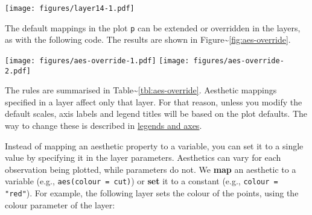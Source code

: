 \texttt{[image: figures/layer14-1.pdf]}

The default mappings in the plot \texttt{p} can be extended or
overridden in the layers, as with the following code.
 The results are shown in
Figure\textasciitilde{}\ref{fig:aes-override}.

\begin{Shaded}
\begin{Highlighting}[]
\StringTok{ }\NormalTok{(}\NormalTok{(} 
\StringTok{ }\NormalTok{(}\NormalTok{(} 
\end{Highlighting}
\end{Shaded}

\texttt{[image: figures/aes-override-1.pdf]}
\texttt{[image: figures/aes-override-2.pdf]}

\noindent The rules are summarised in
Table\textasciitilde{}\ref{tbl:aes-override}. Aesthetic mappings
specified in a layer affect only that layer. For that reason, unless you
modify the default scales, axis labels and legend titles will be based
on the plot defaults. The way to change these is described in
\hyperref[sec:guides]{legends and axes}.


Instead of mapping an aesthetic property to a variable, you can set it
to a single value by specifying it in the layer parameters. Aesthetics
can vary for each observation being plotted, while parameters do not. We
\textbf{map} an aesthetic to a variable (e.g.,
\texttt{aes(colour = cut)}) or \textbf{set} it to a constant (e.g.,
\texttt{colour = "red"}). For example, the following layer sets the
colour of the points, using the colour parameter of the layer:

\begin{Shaded}
\begin{Highlighting}[]
\StringTok{ }
\StringTok{ }\NormalTok{(} \NormalTok{) }
\end{Highlighting}
\end{Shaded}

